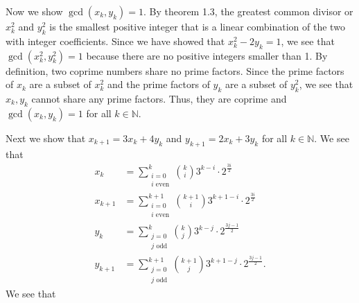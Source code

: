 \documentclass[12 pt]{amsart}
\begin{document}
  Now we show $\gcd(x_k, y_k) = 1$.
  By theorem 1.3, the greatest common divisor 
  or $x_k^2$ and $y_k^2$ is the smallest positive
  integer that is a linear combination of the two
  with integer coefficients.
  Since we have showed that 
  $x_k^2 - 2y_k = 1$, 
  we see that $\gcd(x_k^2, y_k^2) = 1$
  because there are no positive integers smaller than 1.
  By definition, two coprime numbers share no 
  prime factors.
  Since the prime factors of $x_k$ are a subset of 
  $x_k^2$ and the prime factors of $y_k$ are a subset
  of $y_k^2$, we see that
  $x_k, y_k$ cannot share any prime factors. 
  Thus, they are coprime and 
  $\gcd(x_k, y_k) = 1$ for all $k \in \mathbb{N}$.

  Next we show that 
  $x_{k+1} = 3x_k + 4y_k$
  and 
  $y_{k+1} = 2x_k + 3y_k$
  for all $k \in \mathbb{N}$.
  We see that 
  \begin{align*}
    x_k
    &=
      \sum_{\substack{i = 0 \\ \text{$i$ even}}}^k
        \binom{k}{i}
        3^{k-i}
        \cdot
        2^{\frac{3i}{2}} \\
    x_{k+1}
    &=
      \sum_{\substack{i = 0 \\ \text{$i$ even}}}^{k+1}
        \binom{k+1}{i}
        3^{k+1-i}
        \cdot
        2^{\frac{3i}{2}} \\
    y_k 
    &=
        \sum_{\substack{j = 0 \\ \text{$j$ odd}}}^k
        \binom{k}{j}
        3^{k-j}
        \cdot
        2^{\frac{3j-1}{2}} \\
    y_{k+1}
    &=
      \sum_{\substack{j = 0 \\ \text{$j$ odd}}}^{k+1}
        \binom{k+1}{j}
        3^{k+1-j}
        \cdot
        2^{\frac{3j-1}{2}}.
  \end{align*}
  We see that 
\end{document}

